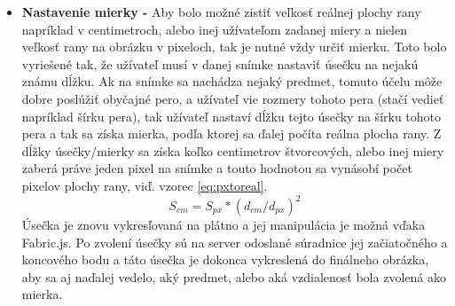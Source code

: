 \begin{itemize}
\item \textbf{Nastavenie mierky -} Aby bolo možné zistiť veľkosť reálnej plochy rany napríklad v centimetroch, alebo inej užívateľom zadanej miery a nielen veľkosť rany na obrázku v pixeloch, tak je nutné vždy určiť mierku. Toto bolo vyriešené tak, že užívateľ musí v danej snímke nastaviť úsečku na nejakú známu dĺžku. Ak na snímke sa nachádza nejaký predmet, tomuto účelu môže dobre poslúžiť obyčajné pero, a užívateľ vie rozmery tohoto pera (stačí vedieť napríklad šírku pera), tak užívateľ nastaví dĺžku tejto úsečky na šírku tohoto pera a tak sa získa mierka, podľa ktorej sa ďalej počíta reálna plocha rany. Z dĺžky úsečky/mierky sa získa koľko centimetrov štvorcových, alebo inej miery zaberá práve jeden pixel na snímke a touto hodnotou sa vynásobí počet pixelov plochy rany, viď. vzorec \ref{eq:pxtoreal}. 
\begin{equation}
    \label{eq:pxtoreal}
    S_{cm} = S_{px} * {(d_{cm}/d_{px})}^2
\end{equation}
Úsečka je znovu vykresľovaná na plátno a jej manipulácia je možná vďaka Fabric.js. Po zvolení úsečky sú na server odoslané súradnice jej začiatočného a koncového bodu a táto úsečka je dokonca vykreslená do finálneho obrázka, aby sa aj naďalej vedelo, aký predmet, alebo aká vzdialenosť bola zvolená ako mierka.
\end{itemize}